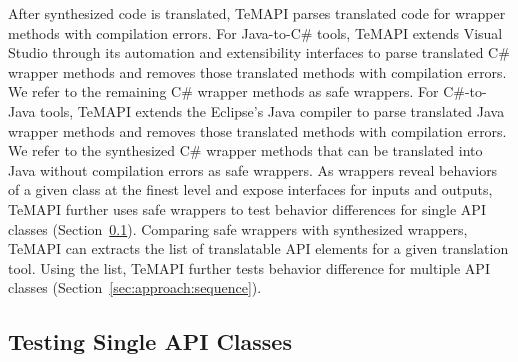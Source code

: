 After synthesized code is translated, TeMAPI parses translated code for wrapper methods with compilation errors. For Java-to-C\# tools, TeMAPI extends Visual Studio through its automation and extensibility interfaces to parse translated C\# wrapper methods and removes those translated methods with compilation errors. We refer to the remaining C\# wrapper methods as safe wrappers. For C\#-to-Java tools, TeMAPI extends the Eclipse's Java compiler to parse translated Java wrapper methods and removes those translated methods with compilation errors. We refer to the synthesized C\# wrapper methods that can be translated into Java without compilation errors as safe wrappers. As wrappers reveal behaviors of a given class at the finest level and expose interfaces for inputs and outputs, TeMAPI further uses safe wrappers to test behavior differences for single API classes (Section~\ref{sec:approach:single}). Comparing safe wrappers with synthesized wrappers, TeMAPI can extracts the list of translatable API elements for a given translation tool. Using the list, TeMAPI further tests behavior difference for multiple API classes (Section~\ref{sec:approach:sequence}).


%


\subsection{Testing Single API Classes}
\label{sec:approach:single}

